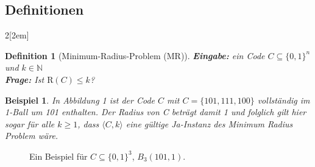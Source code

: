 \documentclass[11pt]{article}
\theoremstyle{break}
\newtheorem{definition}{Definition}
\theoremstyle{norm}
\newtheorem{ex}{Beispiel}
\begin{document}
\subsection{Definitionen}
\begin{multicols}{2}[\columnsep2em]
\begin{definition}[Minimum-Radius-Problem (MR)]
\noindent
\textbf{Eingabe:} ein Code  $C \subseteq \{0,1\}^n$ und $k \in \mathbb{N}$\\
\textbf{Frage:} Ist $\text{R}(C)\leq k$?
\end{definition}
\begin{ex}\label{beispiel1}
 In Abbildung 1 ist der Code $C$ mit $C=\{101,111,100\}$ vollständig im 1-Ball um 101 enthalten. Der Radius von C beträgt damit 1 und folglich gilt hier sogar für alle $k \geq 1$, dass $\langle C,k\rangle$ eine gültige Ja-Instanz des Minimum Radius Problem wäre.
\end{ex}
\columnbreak
\begin{figure}[H]
        \centering
        \caption{Ein Beispiel für $C \subseteq \{0,1\}^3$, $B_3(101,1)$.}
        \label{fig:enter-label}
\end{figure}
\end{multicols}
\end{document}
